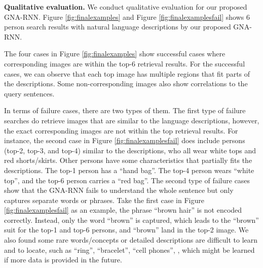 {\bf Qualitative evaluation.} We conduct qualitative evaluation for our proposed GNA-RNN. Figure \ref{fig:finalexamples} and Figure \ref{fig:finalexamplesfail} shows 6 person search results with natural language descriptions by our proposed GNA-RNN. 

The four cases in Figure \ref{fig:finalexamples} show successful cases where corresponding images are within the top-6 retrieval results. For the successful cases, we can observe that each top image has multiple regions that fit parts of the descriptions. Some non-corresponding images also show correlations to the query sentences. 

In terms of failure cases, there are two types of them. The first type of failure searches do retrieve images that are similar to the language descriptions, however, the exact corresponding images are not within the top retrieval results. For instance, the second case in Figure \ref{fig:finalexamplesfail} does include persons (top-2, top-3, and top-4) similar to the descriptions, who all wear white tops and red shorts/skirts. Other persons have some characteristics that partially fits the descriptions. The top-1 person has a ``hand bag''. The top-4 person wears ``white top'', and the top-6 person carries  a ``red bag''. The second type of failure cases show that the GNA-RNN fails to understand the whole sentence but only captures separate words or phrases. Take the first case in Figure \ref{fig:finalexamplesfail} as an example, the phrase ``brown hair'' is not encoded correctly. Instead, only the word ``brown'' is captured, which leads to the ``brown'' suit for the top-1 and top-6 persons, and ``brown'' land in the top-2 image. We also found some rare words/concepts or detailed descriptions are difficult to learn and to locate, such as ``ring'', ``bracelet'', ``cell phones'', \etc, which might be learned if more data is provided in the future.



